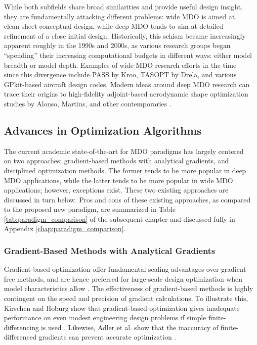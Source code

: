 While both subfields share broad similarities and provide useful design insight, they are fundamentally attacking different problems: wide MDO is aimed at clean-sheet conceptual design, while deep MDO tends to aim at detailed refinement of a close initial design. Historically, this schism became increasingly apparent roughly in the 1990s and 2000s, as various research groups began ``spending'' their increasing computational budgets in different ways: either model breadth or model depth. Examples of wide MDO research efforts in the time since this divergence include PASS \cite{antoine_framework_2005} by Kroo, TASOPT \cite{drela_tasopt_2010} by Drela, and various GPkit-based \cite{hoburg_geometric_2014} aircraft design codes. Modern ideas around deep MDO research can trace their origins to high-fidelity adjoint-based aerodynamic shape optimization studies by Alonso, Martins, and other contemporaries \cite{alonso_pymdo_2004, martins_coupledadjoint_2005, choi_multifidelity_2008}.

\subsection{Advances in Optimization Algorithms}

The current academic state-of-the-art for MDO paradigms has largely centered on two approaches: gradient-based methods with analytical gradients, and disciplined optimization methods. The former tends to be more popular in deep MDO applications, while the latter tends to be more popular in wide MDO applications; however, exceptions exist. These two existing approaches are discussed in turn below. Pros and cons of these existing approaches, as compared to the proposed new paradigm, are summarized in Table \ref{tab:paradigm_comparison} of the subsequent chapter and discussed fully in Appendix \ref{chap:paradigm_comparison}.

\subsubsection{Gradient-Based Methods with Analytical Gradients}

Gradient-based optimization offer fundamental scaling advantages over gradient-free methods, and are hence preferred for large-scale design optimization when model characteristics allow \cite{lyu_benchmarking_2014, martins_engineering_2021}. The effectiveness of gradient-based methods is highly contingent on the speed and precision of gradient calculations. To illustrate this, Kirschen and Hoburg show that gradient-based optimization gives inadequate performance on even modest engineering design problems if simple finite-differencing is used \cite{kirschen}. Likewise, Adler et al. show that the inaccuracy of finite-differenced gradients can prevent accurate optimization \cite{adler_cfd_2022}.

